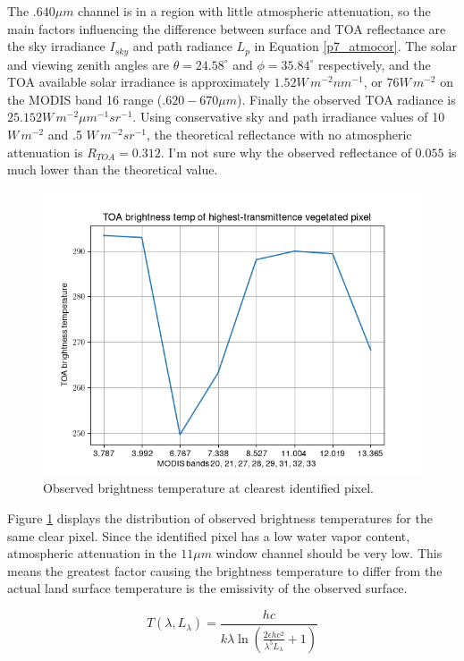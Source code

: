 \documentclass[12pt]{article}
\begin{document}
The $.640\mu m$ channel is in a region with little atmospheric attenuation, so the main factors influencing the difference between surface and TOA reflectance are the sky irradiance $I_{sky}$ and path radiance $L_p$ in Equation \ref{p7_atmocor}. The solar and viewing zenith angles are $\theta = 24.58^\circ$ and $\phi = 35.84^\circ$ respectively, and the TOA available solar irradiance is approximately $1.52 W\,m^{-2}nm^{-1}$, or $76W\,m^{-2}$ on the MODIS band 16 range ($.620-670\mu m$). Finally the observed TOA radiance is $25.152 W\,m^{-2}\mu m^{-1}sr^{-1}$. Using conservative sky and path irradiance values of 10 $W\,m^{-2}$ and .5 $W\,m^{-2}sr^{-1}$, the theoretical reflectance with no atmospheric attenuation is $R_{TOA} = 0.312$. I'm not sure why the observed reflectance of $0.055$ is much lower than the theoretical value.

\begin{figure}[h!]
    \centering
        \includegraphics[width=.8\linewidth]{figures/trans_temp.png}

    \caption{Observed brightness temperature at clearest identified pixel.}
    \label{p7_temp_graph}
\end{figure}

Figure \ref{p7_temp_graph} displays the distribution of observed brightness temperatures for the same clear pixel. Since the identified pixel has a low water vapor content, atmospheric attenuation in the $11\mu m$ window channel should be very low. This means the greatest factor causing the brightness temperature to differ from the actual land surface temperature is the emissivity of the observed surface.

\begin{equation}\label{planck}
        T(\lambda, L_\lambda) = \frac{hc}{k \lambda \ln\left(\frac{2\epsilon hc^2}{\lambda^5 L_\lambda} + 1\right)}
\end{equation}
\end{document}
